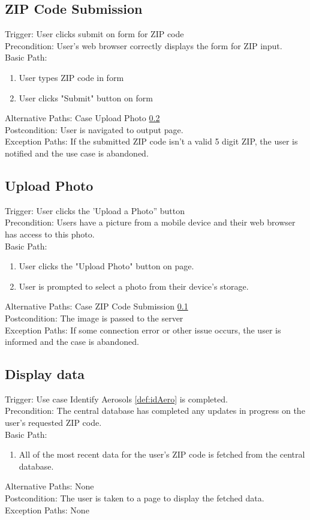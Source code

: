 \documentclass[journal,10pt,draftclsnofoot,onecolumn]{IEEEtran}
\begin{document}
\begin{singlespace}
	\subsection{ZIP Code Submission} \label{def:zip}
		Trigger: User clicks submit on form for ZIP code\\
		Precondition: User's web browser correctly displays the form for ZIP input.\\
		Basic Path:
		\begin{enumerate}
			\item User types ZIP code in form
			\item User clicks "Submit" button on form
		\end{enumerate}
		Alternative Paths: Case Upload Photo \ref{def:upload}\\
		Postcondition: User is navigated to output page.\\
		Exception Paths: If the submitted ZIP code isn't a valid 5 digit ZIP, the user is notified and the use case is abandoned.
	
	\subsection{Upload Photo} \label{def:upload}
		Trigger: User clicks the 'Upload a Photo” button\\
		Precondition: Users have a picture from a mobile device and their web browser has access to this photo.\\
		Basic Path:
		\begin{enumerate}
			\item User clicks the "Upload Photo" button on page.
			\item User is prompted to select a photo from their device's storage.
		\end{enumerate}
		Alternative Paths: Case ZIP Code Submission \ref{def:zip}\\
		Postcondition: The image is passed to the server\\
		Exception Paths: If some connection error or other issue occurs, the user is informed and the case is abandoned.
			
	\subsection{Display data}
		Trigger: Use case Identify Aerosols \ref{def:idAero} is completed.\\
		Precondition: The central database has completed any updates in progress on the user's requested ZIP code.\\
		Basic Path:
		\begin{enumerate}
			\item All of the most recent data for the user's ZIP code is fetched from the central database.
		\end{enumerate}
		Alternative Paths: None\\
		Postcondition: The user is taken to a page to display the fetched data.\\
		Exception Paths: None
\clearpage


\end{singlespace}
\end{document}
